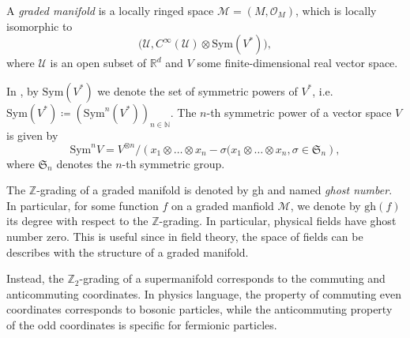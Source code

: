 \begin{definition}
    \label{def:graded_manifold}
    A \emph{graded manifold} is a locally ringed space $\mathcal{M} = (M, \mathcal{O}_M)$, which is locally isomorphic to
    \begin{equation*}
        \Big(\mathcal{U}, C^\infty(\mathcal{U}) \otimes \text{Sym}(V^*) \Big),
    \end{equation*}
    where $\mathcal{U}$ is an open subset of $\mathbb{R}^d$ and $V$ some finite-dimensional real vector space.
\end{definition}
 In , by $\text{Sym}(V^*)$ we denote the set of symmetric powers of $V^*$, i.e. $\text{Sym}(V^*) \coloneqq \left( \text{Sym}^n(V^*) \right)_{n \in \mathbb{N}}$. The $n$-th symmetric power of a vector space $V$ is given by
 \begin{equation*}
     \text{Sym}^n V =
     V^{\otimes n} /
     \left( x_1 \otimes \ldots \otimes x_n - \sigma (x_1 \otimes \ldots \otimes x_n,
     \sigma \in \mathfrak{S}_n \right),
 \end{equation*}
 where $\mathfrak{S}_n$ denotes the $n$-th symmetric group.

The $\mathbb{Z}$-grading of a graded manifold is denoted by gh and named \emph{ghost number}.
In particular, for some function $f$ on a graded manfiold $\mathcal{M}$, we denote by $\text{gh}(f)$ its degree with respect to the $\mathbb{Z}$-grading.
In particular, physical fields have ghost number zero.
This is useful since in field theory, the space of fields can be describes with the structure of a graded manifold.

Instead, the $\mathbb{Z}_2$-grading of a supermanifold corresponds to the commuting and anticommuting coordinates.
In physics language, the property of commuting even coordinates corresponds to bosonic particles, while the anticommuting property of the odd coordinates is specific for fermionic particles.